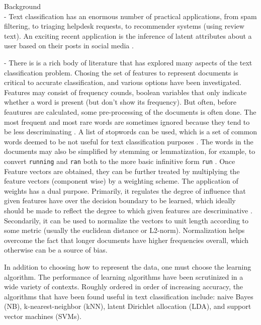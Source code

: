 \documentclass[letterpaper]{article}
\title{}
\author{}
\begin{document}
\maketitle
Background \\
- Text classification has an enormous number of practical applications, from
	spam filtering\cite{wang2013}, to triaging helpdesk requests, to 
	recommender systems (using review text)\cite{jannach2010recommender}.  An 
	exciting recent application 
	is the inference of latent attributes about a user based on their posts in 
	social media \cite{liu2013s,liu2012using,al2012homophily}.

- There is is a rich body of literature that has explored many aspects of
	the text classification problem.  Chosing the set of features to represent
	documents is critical to accurate classification, and various options 
	have been investigated\cite{leopold2002text, wang2013}.  Features may
	consist of frequency counds, boolean variables that only indicate whether
	a word is present (but don't show its frequency)\cite{leopold2002text}.  
	But often, before feautures are calculated, some pre-processing of the
	documents is often done.  The most 
	frequent and most rare words are sometimes ignored because they tend to
	be less descriminating \cite{leopold2002text}.  
	A list of stopwords can be used, which is a set 
	of common words deemed to be not useful for text classification purposes 
	\cite{leopold2002text}.
	The words in the documents may also be simplified by stemming or 
	lemmatization, for example, to convert \texttt{running} and \texttt{ran}
	both to the more basic infinitive form \texttt{run} \cite{leopold2002text}.
	Once Feature vectors are obtained, they can be 
	further treated by multiplying the feature vectors (component wise) by a 
	weighting scheme\cite{leopold2002text}.
	The application of weights has a dual purpose.  
	Primarily, it regulates the degree of influence that given features have
	over the decision boundary to be learned, which ideally should be made to
	reflect the degree to which given features are descriminative 
	\cite{leopold2002text}.  
	Secondarily, it can
	be used to normalize the vectors to unit length according to some metric
	(usually the euclidean distance or L2-norm)\cite{leopold2002text}.  
	Normalization helps 
	overcome the fact that longer documents have higher frequencies overall, 
	which otherwise can be a source of bias\cite{leopold2002text}.

	In addition to choosing how to represent the data, one must choose the
	learning algorithm.  The performance of learning algorithms have been
	scrutinized in a wide variety of contexts.  Roughly ordered in order
	of increasing accuracy, the algorithms that have been found useful in
	text classification include: naive Bayes (NB), k-nearest-neighbor (kNN), 
	latent Dirichlet allocation (LDA), and support vector machines (SVMs).
	
\end{document}
